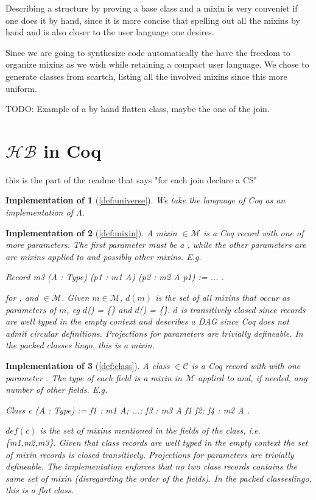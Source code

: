 \documentclass[a4paper,UKenglish,cleveref, autoref]{lipics-v2019}
\newcommand{\HB}{\ensuremath{\mathcal{HB}}}
\newcommand{\Lang}{\ensuremath{\Lambda}}
\newcommand{\mixin}{mixin}
\newcommand{\mixins}{mixins}
\newcommand{\M}{\ensuremath{\mathcal{M}}}
\newcommand{\depx}{\ensuremath{d}}
\newcommand{\C}{\ensuremath{\mathcal{C}}}
\newcommand{\class}{class}
\newcommand{\cdef}{\ensuremath{def}}
\theoremstyle{implem}
\newtheorem*{implementation}{Implementation of}
\theoremstyle{implem}
\theoremstyle{axiom}
\theoremstyle{abscommand}
\theoremstyle{command}
\begin{document}
Describing a structure by proving a base class and a \mixin{} is very conveniet
if one does it by hand, since it is more concise that spelling out all the
\mixins{} by hand and is also closer to the user language one desires.

Since we are going to synthesize code automatically the have the freedom
to organize \mixins{} as we wish while retaining a compact user language.
We chose to generate classes from scartch, listing all the involved
\mixins{} since this more uniform.

TODO: Example of a by hand flatten class, maybe the one of the join.

\section{\HB{} in Coq}\label{sec:compilation}
this is the part of the readme that says "for each join declare a CS"

\begin{implementation}[\autoref{def:universe}]
We take the language of Coq as an implementation of \Lang{}.
\end{implementation}

\begin{implementation}[\autoref{def:mixin}]
A \mixin{}  \(\in \M{}\) is a Coq record with one of more parameters.
The first parameter must be a , while the other parameters are
are \mixins{} applied to  and possibly other \mixins{}. E.g.
\begin{coqcode}
Record m3 (A : Type) (p1 : m1 A) (p2 : m2 A p1) := { ... }.
\end{coqcode}
for ,  and  \(\in \M{}\).
Given \(m \in \M{}\), \(\depx{}(m)\) is the set of all
\mixins{} that occur as parameters of \(m\), eg
\depx{}() = \{\} and \depx{}() = \{\}.
\depx{} is transitively closed since records are well typed
in the empty context and describes a DAG since Coq does not
admit circular definitions.
Projections for parameters are trivially defineable.
In the packed classes lingo, this is a mixin.
\end{implementation}

\begin{implementation}[\autoref{def:class}]
A \class{}  \(\in \C{}\) is a Coq record with with one parameter
. The type of each field is a \mixin{} in \M{} applied to
 and, if needed, any number of other fields. E.g.
\begin{coqcode}
Class c (A : Type) := { f1 : m1 A; ...; f3 : m3 A f1 f2; f4 : m2 A }.
\end{coqcode}
\(\cdef{}(c)\) is the set of \mixins{} mentioned in the fields of the \class{},
i.e. \{m1,m2,m3\}.
Given that \class{} records are well typed in the empty context
the set of \mixin{} records is closed transitively.
Projections for parameters are trivially defineable.
The implementation enforces that no two
\class{} records contains the same set of
\mixin{} (disregarding the order of the fields).
In the packed classeslingo, this is a flat class.
\end{implementation}
\end{document}
